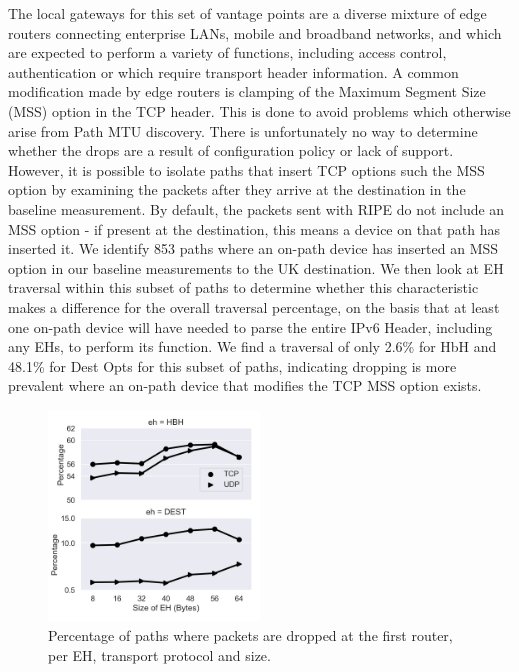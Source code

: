 \documentclass[conference]{IEEEtran}
\begin{document}
The local gateways for this set of vantage points are a diverse mixture of edge routers connecting enterprise LANs, mobile and broadband networks, and which are expected to perform a variety of functions, including access control, authentication or which require transport header information. A common modification made by edge routers is clamping of the Maximum Segment Size (MSS) option in the TCP header. This is done to avoid problems which otherwise arise from Path MTU discovery. 
There is unfortunately no way to determine whether the drops are a result of configuration policy or lack of support. 
However, it is possible to isolate paths that insert TCP options such the MSS option by examining the packets after they arrive at the destination in the baseline measurement. By default, the packets sent with RIPE do not include an MSS option - if present at the destination, this means a device on that path has inserted it.
We identify 853 paths where an on-path device has inserted an MSS option in our baseline measurements to the UK destination. We then look at EH traversal within this subset of paths to determine whether this characteristic makes a difference for the overall traversal percentage, on the basis that at least one on-path device will have needed to parse the entire IPv6 Header, including any EHs, to perform its function.
We find a traversal of only 2.6\% for HbH and 48.1\% for Dest Opts for this subset of paths, indicating dropping is more prevalent where an on-path device that modifies the TCP MSS option exists.


\begin{figure}
\centering
  \includegraphics[width=0.5\textwidth]{empty_paths.png}
  \caption{Percentage of paths where packets are dropped at the first router, per EH, transport protocol and size.}
  \label{fig:empty_paths}
\end{figure}
\end{document}
